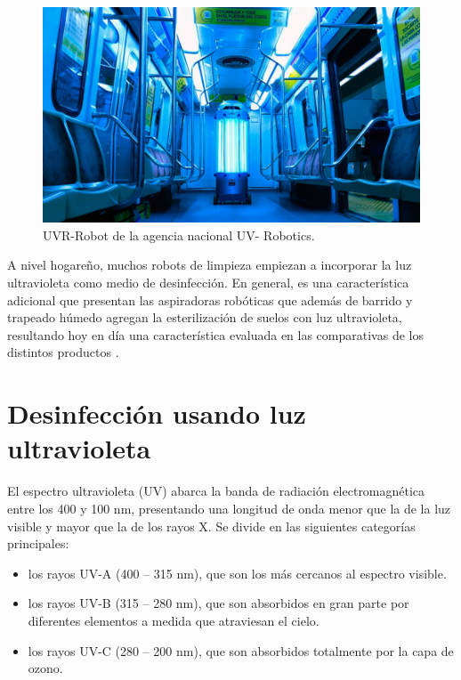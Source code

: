 \begin{figure}[h]
	\centering
	\includegraphics[width=12cm]{./Figures/uvrobot.jpeg}
	\caption{UVR-Robot de la agencia nacional UV- Robotics\protect\footnotemark.}
	\label{fig:uvrobot}
\end{figure}

A nivel hogareño, muchos robots de limpieza empiezan a incorporar la luz ultravioleta como medio de desinfección. En general, es una característica adicional que presentan las aspiradoras robóticas que además de barrido y trapeado húmedo agregan la esterilización de suelos con luz ultravioleta, resultando hoy en día una característica evaluada en las comparativas de los distintos productos  \citep{prueba}.


\section{Desinfección usando luz ultravioleta}

El espectro ultravioleta (UV) abarca la banda de radiación electromagnética entre los 400 y 100 nm, presentando una longitud de onda menor que la de la luz visible y mayor que la de los rayos X.  Se divide en las siguientes categorías principales:

\begin{itemize}
	\item los rayos UV-A (400 – 315 nm), que son los más cercanos al espectro visible.
	\item los rayos UV-B (315 – 280 nm), que son absorbidos en gran parte por diferentes elementos a medida que atraviesan el cielo.
	\item los rayos UV-C (280 – 200 nm), que son absorbidos totalmente por la capa de ozono.
\end{itemize}


